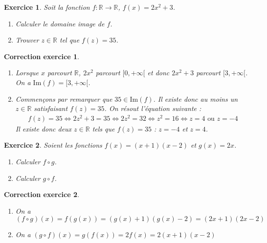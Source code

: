 \documentclass[12pt]{article}
\newtheorem{exercice}{\bf Exercice}
\newtheorem{correction}{\bf Correction exercice}
\newenvironment{exo}{
\begin{exercice}\smallskip\normalfont}{\end{exercice}
}
\newenvironment{cor}{
\begin{correction}\smallskip\normalfont}{\end{correction}
}
\newcommand*{\R}{\mathbb{R}}
\newif\ifcorrige\corrigetrue
\begin{document}

\begin{exo} Soit la fonction $f : \R \to \R$, $f(x) = 2x^2+3$.
\begin{multicols}{2}
\begin{enumerate}
\item Calculer le domaine image de $f$.
\item Trouver $z\in\R$ tel que $f(z) = 35$.
\end{enumerate}
\end{multicols}
\end{exo}

\ifcorrige
\color{magenta}
\begin{cor}
  $\qquad$
\begin{enumerate}
\item Lorsque $x$ parcourt $\R$, $2x^2$ parcourt $[0,+\infty[$ et donc $2x^2+3$ parcourt $[3,+\infty[$.
  On a $\text{Im}(f) = [3,+\infty[$.
\item Commen\c{c}ons par remarquer que $35 \in \text{Im}(f)$.
  Il existe donc au moins un $z \in \R$ satisfaisant $f(z) = 35$.
  On r\'esout l'\'equation suivante :
  \begin{align*}
    f(z) = 35
    \iff
    2z^2+3 = 35
    \iff
    2z^2 = 32
    \iff
    z^2 = 16
    \iff
    z = 4 \text{  ou  } z = -4
  \end{align*}
  Il existe donc deux $z \in \R$ tels que $f(z) = 35$ :
  $z=-4$ et $z=4$.
\end{enumerate}
\end{cor}
\color{black}
\fi


\begin{exo} Soient les fonctions $f(x) = (x+1)(x-2)$
  et $g(x) = 2x$.
\begin{multicols}{2}
\begin{enumerate}
\item Calculer $f \circ g$.
\item Calculer $g \circ f$.
\end{enumerate}
\end{multicols}
\end{exo}

\ifcorrige
\color{magenta}
\begin{cor}
  $\qquad$
\begin{enumerate}
\item On a
    $(f \circ g) (x) = f(g(x)) = (g(x)+1)(g(x)-2) = (2x+1)(2x-2)$
\item On a
    $(g \circ f) (x) = g(f(x)) = 2 f(x) = 2(x+1)(x-2)$
\end{enumerate}
\end{cor}
\color{black}
\fi
\end{document}
